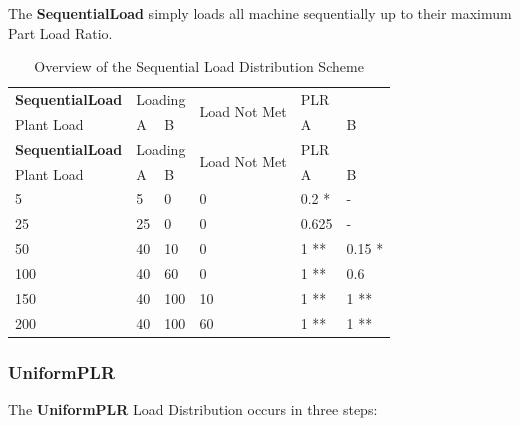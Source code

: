 The \textbf{SequentialLoad} simply loads all machine sequentially up to their maximum Part Load Ratio.

\begin{longtable}[c]{|l|p{0.5in}|p{0.5in}|l|p{0.5in}|p{0.5in}|}
    \caption{Overview of the Sequential Load Distribution Scheme}
    \label{tab:sequantial-load-overview}\\
\hline

\textbf{SequentialLoad} & \multicolumn{2}{l|}{Loading} & \multirow{2}{*}{Load Not Met} & \multicolumn{2}{l|}{PLR} \\ \cline{1-3} \cline{5-6}
Plant Load      & A             & B            &                               & A          & B           \\ \hline
\endfirsthead
\hline
\textbf{SequentialLoad} & \multicolumn{2}{l|}{Loading} & \multirow{2}{*}{Load Not Met} & \multicolumn{2}{l|}{PLR} \\ \cline{1-3} \cline{5-6}
Plant Load      & A             & B            &                               & A          & B           \\ \hline
\endhead

5               & 5             & 0            & 0                             & 0.2 *      & -           \\ \hline
25              & 25            & 0            & 0                             & 0.625      & -           \\ \hline
50              & 40            & 10           & 0                             & 1 **       & 0.15 *      \\ \hline
100             & 40            & 60           & 0                             & 1 **       & 0.6         \\ \hline
150             & 40           & 100           & 10                            & 1 **       & 1 **        \\ \hline
200             & 40           & 100           & 60                            & 1 **       & 1 **        \\ \hline
\end{longtable}


\subsubsection{UniformPLR}%
\label{ssub:uniformplr}

The \textbf{UniformPLR} Load Distribution occurs in three steps:


